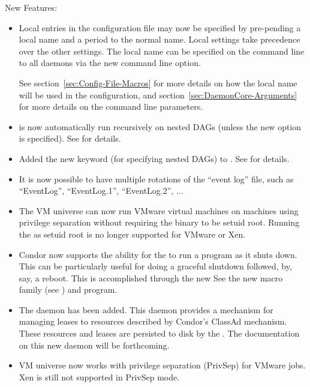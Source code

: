 \noindent New Features:

\begin{itemize}

\item Local entries in the configuration file may now be specified
by pre-pending a local name and a period to the normal name.
Local settings take precedence over the other settings.
The local name can be specified on the command line to all daemons via
the new  command line option. 

See section~\ref{sec:Config-File-Macros} 
for more details on how the local name will be used in the configuration,
and section~\ref{sec:DaemonCore-Arguments} 
for more details on the command line parameters.

\item {} is now automatically run recursively on
nested DAGs (unless the new  option is specified).
See \pageref{dagman:NestedRecursion} for details.

\item Added the new  keyword (for specifying nested
DAGs) to .  See \pageref{dagman:SUBDAG} for details.

\item It is now possible to have multiple rotations of the ``event
  log'' file, such as ``EventLog'', ``EventLog.1'', ``EventLog.2'', ...

\item The VM universe can now run VMware virtual machines on machines using
privilege separation without requiring the  binary to be
setuid root. Running the  as setuid root is no longer
supported for VMware or Xen.

\item Condor now supports the ability for the  to run a
  program as it shuts down.  This can be particularly useful for doing
  a graceful shutdown followed, by, say, a reboot.  This is
  accomplished through the new See the new
   macro family (see
  \pageref{param:MasterShutdownProgram}) and 
  program.

\item The  daemon has been added.  This daemon
  provides a mechanism for managing leases to resources described by
  Condor's ClassAd mechanism.  These resources and leases are
  persisted to disk by the .  The documentation
  on this new daemon will be forthcoming.

\item VM universe now works with privilege separation (PrivSep)
for VMware jobs. Xen is still not supported in PrivSep mode.

\end{itemize}

